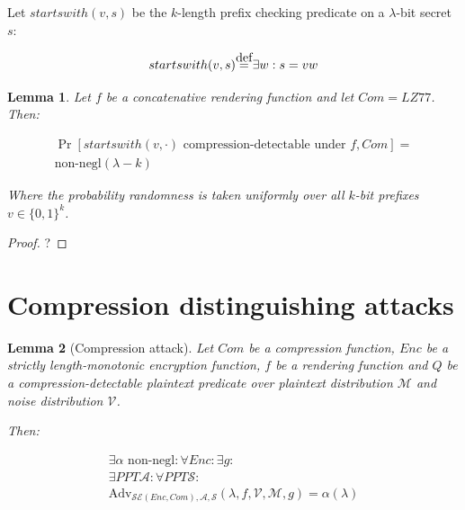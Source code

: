 \documentclass{sig-alternate-05-2015}
\newtheorem{lemma}{Lemma}
\newcommand\defeq{\stackrel{\mathclap{\normalfont\mbox{def}}}{=}}
\begin{document}
Let $startswith(v, s)$ be the $k$-length prefix checking predicate on a
$\lambda$-bit secret $s$:

\begin{equation*}
    startswith(v, s) \defeq \exists w: s = v w
\end{equation*}

\begin{lemma}

Let $f$ be a concatenative rendering function and let $Com = LZ77$. Then:

\begin{align*}
\Pr[startswith(v, \cdot) \textrm{ compression-detectable under } f, Com] =\\ \text{non-negl}(\lambda - k)
\end{align*}

Where the probability randomness is taken uniformly over all $k$-bit prefixes $v \in \{0, 1\}^k$.

\end{lemma}

\begin{proof}
?
\end{proof}

\section{Compression distinguishing attacks}\label{sec:comattack}

\begin{lemma}[Compression attack]

Let $Com$ be a compression function, $Enc$ be a strictly length-monotonic
encryption function, $f$ be a rendering function and $Q$ be a
compression-detectable plaintext predicate over plaintext distribution
$\mathcal{M}$ and noise distribution $\mathcal{V}$.

Then:

\begin{align*}
    \exists \alpha \text{ non-negl}:
    \forall Enc:
    \exists g:\\
    \exists PPT \mathcal{A}:
    \forall PPT \mathcal{S}:\\
    \text{Adv}_{\mathcal{SE}(Enc, Com), \mathcal{A}, \mathcal{S}}
    (\lambda, f, \mathcal{V}, \mathcal{M}, g) = \alpha(\lambda)
\end{align*}

\end{lemma}
\end{document}
